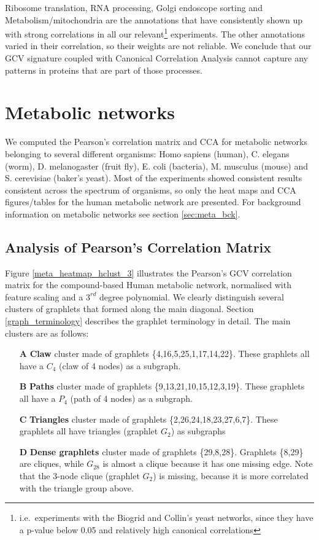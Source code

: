 Ribosome translation, RNA processing, Golgi endoscope sorting and Metabolism/mitochondria are the annotations that have consistently shown up with strong correlations in all our relevant\footnote{i.e.\ experiments with the Biogrid and Collin's yeast networks, since they have a p-value below 0.05 and relatively high canonical correlations} experiments. The other annotations varied in their correlation, so their weights are not reliable. We conclude that our GCV signature coupled with Canonical Correlation Analysis cannot capture any patterns in proteins that are part of those processes. 

\section{Metabolic networks}
\label{meta_res_heatmaps}

We computed the Pearson's correlation matrix and CCA for metabolic networks belonging to several different organisms: Homo sapiens (human), C. elegans (worm), D. melanogaster (fruit fly), E. coli (bacteria), M. musculus (mouse) and S. cerevisiae (baker's yeast). Most of the experiments showed consistent results consistent across the spectrum of organisms, so only the heat maps and CCA figures/tables for the human metabolic network are presented. For background information on metabolic networks see section \ref{sec:meta_bck}.

\subsection{Analysis of Pearson's Correlation Matrix}

Figure \ref{meta_heatmap_hclust_3} illustrates the Pearson's GCV correlation matrix for the compound-based Human metabolic network, normalised with feature scaling and a $3^{rd}$ degree polynomial. We clearly distinguish several clusters of graphlets that formed along the main diagonal. Section \ref{graph_terminology} describes the graphlet terminology in detail. The main clusters are as follows:
\begin{enumerate}
 \item[\textbf{A}] \textbf{Claw} cluster made of graphlets \{4,16,5,25,1,17,14,22\}. These graphlets all have a $C_4$ (claw of 4 nodes) as a subgraph.
 \item[\textbf{B}] \textbf{Paths} cluster made of graphlets \{9,13,21,10,15,12,3,19\}. These graphlets all have a $P_4$ (path of 4 nodes) as a subgraph.
 \item[\textbf{C}] \textbf{Triangles} cluster made of graphlets \{2,26,24,18,23,27,6,7\}. These graphlets all have triangles (graphlet $G_2$) as subgraphs
 \item[\textbf{D}] \textbf{Dense graphlets} cluster made of graphlets \{29,8,28\}. Graphlets \{8,29\} are cliques, while $G_{28}$ is almost a clique because it has one missing edge. Note that the 3-node clique (graphlet $G_2$) is missing, because it is more correlated with the triangle group above.
 \end{enumerate}

